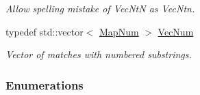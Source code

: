 \begin{DoxyCompactItemize}
\begin{DoxyCompactList}\small\item\em Allow spelling mistake of Vec\+NtN as Vec\+Ntn. \end{DoxyCompactList}\item 
typedef std\+::vector$<$ \hyperlink{namespacejpcre2_a947e37f0e4a1678157e7f1f855638e82}{Map\+Num} $>$ \hyperlink{namespacejpcre2_ac1cf752c8fbb0be78020be3b80e77ce3}{Vec\+Num}\hypertarget{namespacejpcre2_ac1cf752c8fbb0be78020be3b80e77ce3}{}\label{namespacejpcre2_ac1cf752c8fbb0be78020be3b80e77ce3}

\begin{DoxyCompactList}\small\item\em Vector of matches with numbered substrings. \end{DoxyCompactList}\end{DoxyCompactItemize}
\subsubsection*{Enumerations}
